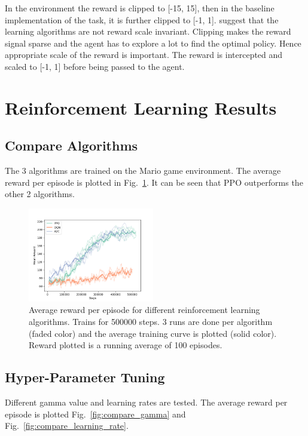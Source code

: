 \documentclass[conference]{IEEEtran}
\begin{document}
In the environment the reward is clipped to [-15, 15], then in the baseline implementation of the task, it is further clipped to [-1, 1]. \cite{vanhasseltLearningValuesMany2016} suggest that the learning algorithms are not reward scale invariant. Clipping makes the reward signal sparse and the agent has to explore a lot to find the optimal policy. Hence appropriate scale of the reward is important. The reward is intercepted and scaled to [-1, 1] before being passed to the agent.

\section{Reinforcement Learning Results}

\subsection{Compare Algorithms}

The 3 algorithms are trained on the Mario game environment. The average reward per episode is plotted in Fig.~\ref{fig:compare_algorithms}. It can be seen that PPO outperforms the other 2 algorithms.

\begin{figure}
    \centering
    \includegraphics[width=0.49\textwidth]{compare_alg.png}
    \caption{Average reward per episode for different reinforcement learning algorithms. Trains for 500000 steps. 3 runs are done per algorithm (faded color) and the average training curve is plotted (solid color). Reward plotted is a running average of 100 episodes.}
    \label{fig:compare_algorithms}
\end{figure}

\subsection{Hyper-Parameter Tuning}

Different gamma value and learning rates are tested. The average reward per episode is plotted Fig.~\ref{fig:compare_gamma} and Fig.~\ref{fig:compare_learning_rate}.
\end{document}
